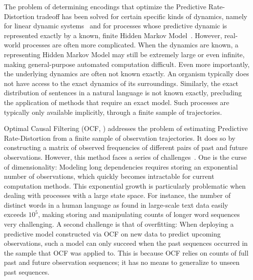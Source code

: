 \documentclass[entropy,article,submit,moreauthors,pdftex,10pt,a4paper]{Definitions/mdpi}
\begin{document}
The problem of determining encodings that optimize the Predictive Rate-Distortion tradeoff has been solved for certain specific kinds of dynamics, namely for linear dynamic systems~\citep{creutzig-past-future-2009} and for processes whose predictive dynamic is represented exactly by a known, finite Hidden Markov Model~\citep{marzen-predictive-2016}.
However, real-world processes are often more complicated.
When the dynamics are known, a representing Hidden Markov Model may still be extremely large or even infinite, making general-purpose automated computation difficult.
Even more importantly, the underlying dynamics are often not known exactly.
An organism typically does not have access to the exact dynamics of its surroundings.
Similarly, the exact distribution of sentences in a natural language is not known exactly, precluding the application of methods that require an exact model.
Such processes are typically only available implicitly, through a finite sample of trajectories.



Optimal Causal Filtering (OCF, \citet{still-optimal-2010}) addresses the problem of estimating Predictive Rate-Distortion from a finite sample of observation trajectories.
It does so by constructing a matrix of observed frequencies of different pairs of past and future observations.
However, this method faces a series of challenges~\citep{marzen-predictive-2016}.
One is the curse of dimensionality:
Modeling long dependencies requires storing an exponential number of observations, which quickly becomes intractable for current computation methods.
This exponential growth is particularly problematic when dealing with processes with a large state space.
For instance, the number of distinct words in a human language as found in large-scale text data easily exceeds $10^5$, making storing and manipulating counts of longer word sequences very challenging.
A second challenge is that of overfitting:
When deploying a predictive model constructed via OCF on new data to predict upcoming observations, such a model can only succeed when the past sequences occurred in the sample that OCF was applied to.
This is because OCF relies on counts of full past and future observation sequences; it has no means to generalize to unseen past sequences.
\end{document}
